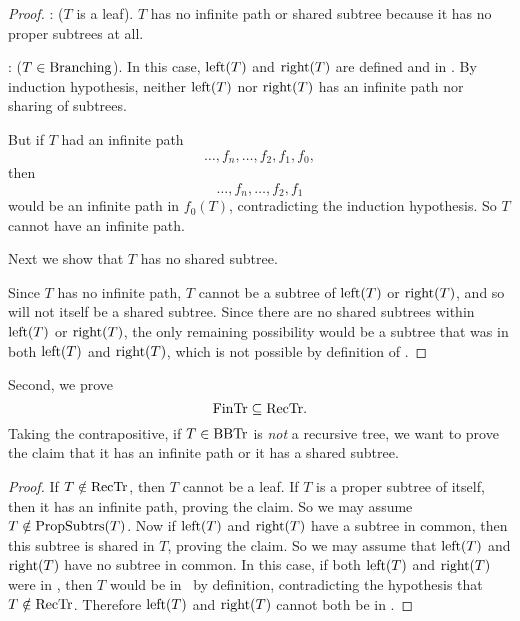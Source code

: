 \begin{definition}
\begin{proof}
: ($T$ is a leaf).  $T$ has no infinite path
or shared subtree because it has no proper subtrees at all.

: ($T \in \text{Branching}$).  In this case,
$\text{left}(T)$ and $\text{right}(T)$ are defined and in \rectr.  By
induction hypothesis, neither $\text{left}(T)$ nor $\text{right}(T)$ has an
infinite path nor sharing of subtrees.

But if $T$ had an infinite path
\[
\dots,f_n,\dots, f_2,f_1,f_0,
\]
then
\begin{equation}\label{dfnf2f1}
\dots,f_n,\dots,f_2,f_1
\end{equation}
would be an infinite path in $f_0(T)$, contradicting the induction
hypothesis.  So $T$ cannot have an infinite path.

Next we show that $T$ has no shared subtree.

Since $T$ has no infinite path, $T$ cannot be a subtree of
$\text{left}(T)$ or $\text{right}(T)$, and so will not itself be a
shared subtree.  Since there are no shared subtrees within
$\text{left}(T)$ or $\text{right}(T)$, the only remaining possibility
would be a subtree that was in both $\text{left}(T)$ and
$\text{right}(T)$, which is not possible by definition of \rectr.
\end{proof}

Second, we prove
\begin{equation}\label{fintrsubrectr}
\text{FinTr} \subseteq \text{RecTr}.
\end{equation}
Taking the contrapositive, if $T \in \text{BBTr}$ is \emph{not} a recursive
tree, we want to prove the claim that it has an infinite path or it
has a shared subtree.

\begin{proof}
If $T \notin \text{RecTr}$, then $T$ cannot be a leaf.  If $T$ is a proper
subtree of itself, then it has an infinite path, proving the claim.
So we may assume $T \notin \text{PropSubtrs}(T)$.  Now if $\text{left}(T)$ and
$\text{right}(T)$ have a subtree in common, then this subtree is shared
in $T$, proving the claim.  So we may assume that $\text{left}(T)$ and
$\text{right}(T)$ have no subtree in common.  In this case, if both
$\text{left}(T)$ and $\text{right}(T)$ were in \rectr, then $T$ would be
in \rectr\ by definition, contradicting the hypothesis that $T \notin
\text{RecTr}$.  Therefore $\text{left}(T)$ and $\text{right}(T)$ cannot both
be in \rectr.


\end{proof}
\end{definition}
